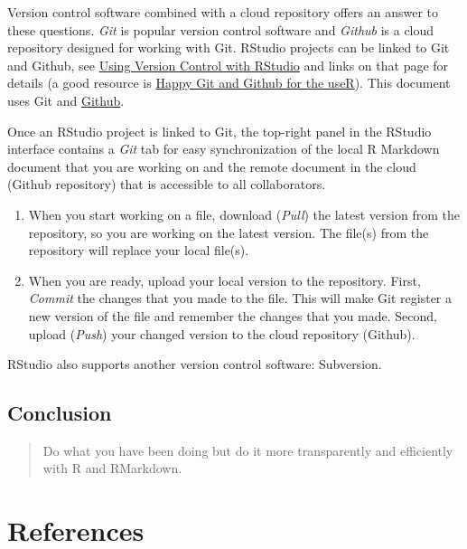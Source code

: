 \documentclass[doc,floatsintext]{apa6}
\begin{document}
Version control software combined with a cloud repository offers an
answer to these questions. \emph{Git} is popular version control
software and \emph{Github} is a cloud repository designed for working
with Git. RStudio projects can be linked to Git and Github, see
\href{https://support.rstudio.com/hc/en-us/articles/200532077}{Using
Version Control with RStudio} and links on that page for details (a good
resource is \href{http://happygitwithr.com/}{Happy Git and Github for
the useR}). This document uses Git and
\href{https://github.com/WdeNooy/Switch2R}{Github}.

Once an RStudio project is linked to Git, the top-right panel in the
RStudio interface contains a \emph{Git} tab for easy synchronization of
the local R Markdown document that you are working on and the remote
document in the cloud (Github repository) that is accessible to all
collaborators.

\begin{enumerate}
\def\labelenumi{\arabic{enumi}.}
\item
  When you start working on a file, download (\emph{Pull}) the latest
  version from the repository, so you are working on the latest version.
  The file(s) from the repository will replace your local file(s).
\item
  When you are ready, upload your local version to the repository.
  First, \emph{Commit} the changes that you made to the file. This will
  make Git register a new version of the file and remember the changes
  that you made. Second, upload (\emph{Push}) your changed version to
  the cloud repository (Github).
\end{enumerate}

RStudio also supports another version control software: Subversion.

\subsection{Conclusion}\label{conclusion}

\begin{quote}
Do what you have been doing but do it more transparently and efficiently
with R and RMarkdown.
\end{quote}

\newpage

\section{References}\label{references}
\end{document}
